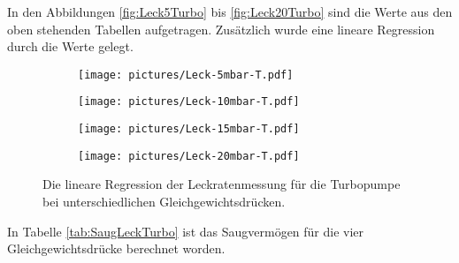In den Abbildungen \eqref{fig:Leck5Turbo} bis \eqref{fig:Leck20Turbo} sind die Werte aus den oben stehenden Tabellen aufgetragen. Zusätzlich wurde eine lineare Regression durch die Werte gelegt.

\begin{figure}[H]
  \begin{subfigure}[c]{0.49\textwidth}
    \texttt{[image: pictures/Leck-5mbar-T.pdf]}
    \label{fig:Leck5Turbo}
  \end{subfigure}\hfill
  \begin{subfigure}[c]{0.49\textwidth}
    \texttt{[image: pictures/Leck-10mbar-T.pdf]}
    \label{fig:Leck10Turbo}
  \end{subfigure}

  \begin{subfigure}[c]{0.49\textwidth}
    \texttt{[image: pictures/Leck-15mbar-T.pdf]}
    \label{fig:Leck15Turbo}
  \end{subfigure}\hfill
  \begin{subfigure}[c]{0.49\textwidth}
    \texttt{[image: pictures/Leck-20mbar-T.pdf]}
    \label{fig:Leck20Turbo}
  \end{subfigure}

  \caption{Die lineare Regression der Leckratenmessung für die Turbopumpe bei unterschiedlichen Gleichgewichtsdrücken.}
\end{figure}

In Tabelle \eqref{tab:SaugLeckTurbo} ist das Saugvermögen für die vier Gleichgewichtsdrücke berechnet worden.

